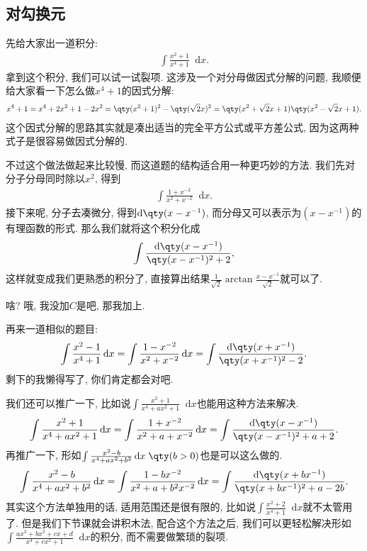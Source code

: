 \documentclass{ctexbook}
\newcommand*{\dif}{\mathop{}\!\mathrm{d}}
\begin{document}
{\subsection{对勾换元}
先给大家出一道积分: 
\begin{align*}
\int\frac{x^{2}+1}{x^{4}+1}\dif{x}
.\end{align*}
拿到这个积分, 我们可以试一试裂项. 这涉及一个对分母做因式分解的问题, 我顺便给大家看一下怎么做$x^{4}+1$的因式分解: 
\begin{align*}
x^{4}+1=x^{4}+2x^{2}+1-2x^{2}=\qty(x^{2}+1)^{2}-\qty(\sqrt{2}x)^{2}=\qty(x^{2}+\sqrt{2}x+1)\qty(x^{2}-\sqrt{2}x+1)
.\end{align*}
这个因式分解的思路其实就是凑出适当的完全平方公式或平方差公式, 因为这两种式子是很容易做因式分解的. \par
不过这个做法做起来比较慢, 而这道题的结构适合用一种更巧妙的方法. 我们先对分子分母同时除以$x^{2}$, 得到
\begin{align*}
\int\frac{1+x^{-2}}{x^{2}+x^{-2}}\dif{x}
.\end{align*}
接下来呢, 分子去凑微分, 得到$\dif{\qty(x-x^{-1})}$, 而分母又可以表示为$(x-x^{-1})$的有理函数的形式. 那么我们就将这个积分化成
\begin{align*}
\int\frac{\dif{\qty(x-x^{-1})}}{\qty(x-x^{-1})^{2}+2}
,\end{align*}
这样就变成我们更熟悉的积分了, 直接算出结果$\frac{1}{\sqrt{2}}\arctan{\frac{x-x^{-1}}{\sqrt{2}}}$就可以了. \par
啥? 哦, 我没加$C$是吧, 那我加上. \par
再来一道相似的题目: 
\begin{align*}
\int\frac{x^{2}-1}{x^{4}+1}\dif{x}=\int\frac{1-x^{-2}}{x^{2}+x^{-2}}\dif{x}=\int\frac{\dif{\qty(x+x^{-1})}}{\qty(x+x^{-1})^{2}-2}
.\end{align*}
剩下的我懒得写了, 你们肯定都会对吧. \par
我们还可以推广一下, 比如说$\int\frac{x^{2}+1}{x^{4}+ax^{2}+1}\dif{x}$也能用这种方法来解决. 
\begin{align*}
\int\frac{x^{2}+1}{x^{4}+ax^{2}+1}\dif{x}=\int\frac{1+x^{-2}}{x^{2}+a+x^{-2}}\dif{x}=\int\frac{\dif{\qty(x-x^{-1})}}{\qty(x-x^{-1})^{2}+a+2}
.\end{align*}
再推广一下, 形如$\int\frac{x^{2}-b}{x^{4}+ax^{2}+b^{2}}\dif{x}\;\qty(b>0)$也是可以这么做的. 
\begin{align*}
\int\frac{x^{2}-b}{x^{4}+ax^{2}+b^{2}}\dif{x}=\int\frac{1-bx^{-2}}{x^{2}+a+b^{2}x^{-2}}\dif{x}=\int\frac{\dif{\qty(x+bx^{-1})}}{\qty(x+bx^{-1})^{2}+a-2b}
.\end{align*}
其实这个方法单独用的话, 适用范围还是很有限的, 比如说$\int\frac{x^{2}+2}{x^{4}+1}\dif{x}$就不太管用了. 但是我们下节课就会讲积木法, 配合这个方法之后, 我们可以更轻松解决形如$\int\frac{ax^{3}+bx^{2}+cx+d}{x^{4}+ex^{2}+1}\dif{x}$的积分, 而不需要做繁琐的裂项. \par
}
\end{document}
